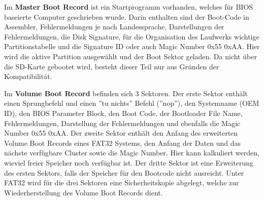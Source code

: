 
Im \textbf{Master Boot Record} ist ein Startprogramm vorhanden, welches für BIOS baseierte Computer geschrieben wurde.
Darin enthalten sind der Boot-Code in Assembler, Fehlermeldungen je nach Landessprache, Darstellungen der Fehlermeldungen, die Disk Signature, für die Organisation des Laufwerks wichtige Partitionstabelle und die Signature ID oder auch Magic Number 0x55 0xAA. Hier wird die aktive Partition ausgewählt und der Boot Sektor geladen. Da nicht über die SD-Karte gebootet wird, besteht dieser Teil nur aus Gründen der Kompatibilität.



Im \textbf{Volume Boot Record} befinden sich 3 Sektoren. Der erste Sektor enthält einen Sprungbefehl und einen ''tu nichts'' Befehl (''nop''), den Systemname (OEM ID), den BIOS Parameter Block, den Boot Code, der Bootloader File Name, Fehlermeldungen, Darstellung der Fehlermeldungen und ebenfalls die Magic Number 0x55 0xAA. Der zweite Sektor enthält den Anfang des erweiterten Volume Boot Records eines FAT32 Systems, den Anfang der Daten und das nächste verfügbare Cluster sowie die Magic Number. Hier kann kalkuliert werden, wieviel freier Speicher noch verfügbar ist. Der dritte Sektor ist eine Erweiterung des ersten Sektors, falls der Speicher für den Bootcode nicht ausreicht. Unter FAT32 wird für die drei Sektoren eine Sicherheitskopie abgelegt, welche zur Wiederherstellung des Volume Boot Records dient.

